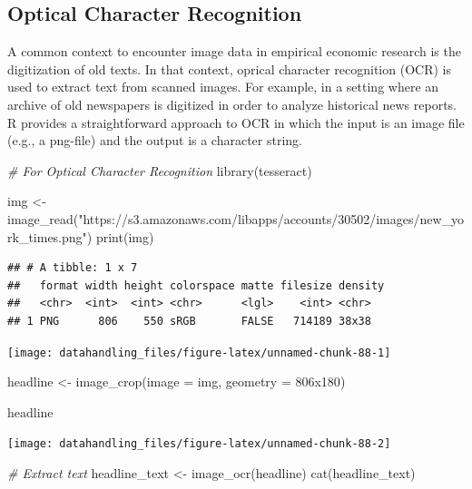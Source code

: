 \documentclass[
  12pt,
]{style/krantz}
\newenvironment{Shaded}{\begin{snugshade}}{\end{snugshade}}
\newcommand{\AttributeTok}[1]{\textcolor[rgb]{0.77,0.63,0.00}{#1}}
\newcommand{\CommentTok}[1]{\textcolor[rgb]{0.56,0.35,0.01}{\textit{#1}}}
\newcommand{\FunctionTok}[1]{\textcolor[rgb]{0.00,0.00,0.00}{#1}}
\newcommand{\NormalTok}[1]{#1}
\newcommand{\OtherTok}[1]{\textcolor[rgb]{0.56,0.35,0.01}{#1}}
\newcommand{\StringTok}[1]{\textcolor[rgb]{0.31,0.60,0.02}{#1}}
\begin{document}
\hypertarget{optical-character-recognition}{%
\subsection{Optical Character Recognition}\label{optical-character-recognition}}

A common context to encounter image data in empirical economic research is the digitization of old texts. In that context, oprical character recognition (OCR) is used to extract text from scanned images. For example, in a setting where an archive of old newspapers is digitized in order to analyze historical news reports. R provides a straightforward approach to OCR in which the input is an image file (e.g., a png-file) and the output is a character string.

\begin{Shaded}
\begin{Highlighting}[]
\CommentTok{\# For Optical Character Recognition}
\FunctionTok{library}\NormalTok{(tesseract)}

\NormalTok{img }\OtherTok{\textless{}{-}} \FunctionTok{image\_read}\NormalTok{(}\StringTok{"https://s3.amazonaws.com/libapps/accounts/30502/images/new\_york\_times.png"}\NormalTok{)}
\FunctionTok{print}\NormalTok{(img)}
\end{Highlighting}
\end{Shaded}

\begin{verbatim}
## # A tibble: 1 x 7
##   format width height colorspace matte filesize density
##   <chr>  <int>  <int> <chr>      <lgl>    <int> <chr>  
## 1 PNG      806    550 sRGB       FALSE   714189 38x38
\end{verbatim}

\texttt{[image: datahandling\_files/figure-latex/unnamed-chunk-88-1]}

\begin{Shaded}
\begin{Highlighting}[]
\NormalTok{headline }\OtherTok{\textless{}{-}} 
  \FunctionTok{image\_crop}\NormalTok{(}\AttributeTok{image =}\NormalTok{ img, }\AttributeTok{geometry =} \StringTok{\textquotesingle{}806x180\textquotesingle{}}\NormalTok{)}

\NormalTok{headline}
\end{Highlighting}
\end{Shaded}

\texttt{[image: datahandling\_files/figure-latex/unnamed-chunk-88-2]}

\begin{Shaded}
\begin{Highlighting}[]
\CommentTok{\# Extract text}
\NormalTok{headline\_text }\OtherTok{\textless{}{-}} \FunctionTok{image\_ocr}\NormalTok{(headline)}
\FunctionTok{cat}\NormalTok{(headline\_text)}
\end{Highlighting}
\end{Shaded}
\end{document}
